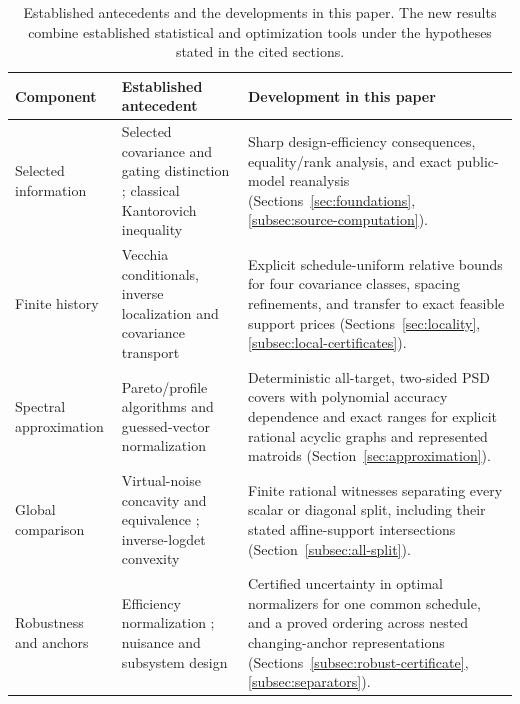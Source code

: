 \begin{table}[htbp]
\centering\small
\caption{Established antecedents and the developments in this paper. The new
results combine established statistical and optimization tools under the
hypotheses stated in the cited sections.}
\label{tab:prior-contributions}
\begin{tabular}{@{}>{\raggedright\arraybackslash}p{}>{\raggedright\arraybackslash}p{}>{\raggedright\arraybackslash}p{}@{}}
\toprule
Component & Established antecedent & Development in this paper\\
\midrule
Selected information & Selected covariance and gating distinction
\citep{Liu2016}; classical Kantorovich inequality \citep{Moradi2019}
& Sharp design-efficiency consequences, equality/rank analysis, and exact
public-model reanalysis (Sections~\ref{sec:foundations},
\ref{subsec:source-computation}).\\[4pt]
Finite history & Vecchia conditionals, inverse localization and covariance
transport \citep{Vecchia1988,Schafer2021,Kozdoba2019}
& Explicit schedule-uniform relative bounds for four covariance classes,
spacing refinements, and transfer to exact feasible support prices
(Sections~\ref{sec:locality}, \ref{subsec:local-certificates}).\\[4pt]
Spectral approximation & Pareto/profile algorithms and guessed-vector
normalization \citep{Berstein2008,Tsaggouris2009,Brown2024}
& Deterministic all-target, two-sided PSD covers with polynomial accuracy
dependence and exact ranges for explicit rational acyclic graphs and represented matroids
(Section~\ref{sec:approximation}).\\[4pt]
Global comparison & Virtual-noise concavity and equivalence
\citep{Liu2016,Pazman2022,Hainy2025}; inverse-logdet convexity
\citep{KimKim2006}
& Finite rational witnesses separating every scalar or diagonal split,
including their stated affine-support intersections
(Section~\ref{subsec:all-split}).\\[4pt]
Robustness and anchors & Efficiency normalization
\citep{Burclova2016,Maus2010}; nuisance and subsystem design
\citep{Alexanderian2021,Sagnol2015}
& Certified uncertainty in optimal normalizers for one common schedule, and a proved
ordering across nested changing-anchor representations
(Sections~\ref{subsec:robust-certificate}, \ref{subsec:separators}).\\
\bottomrule
\end{tabular}
\end{table}

